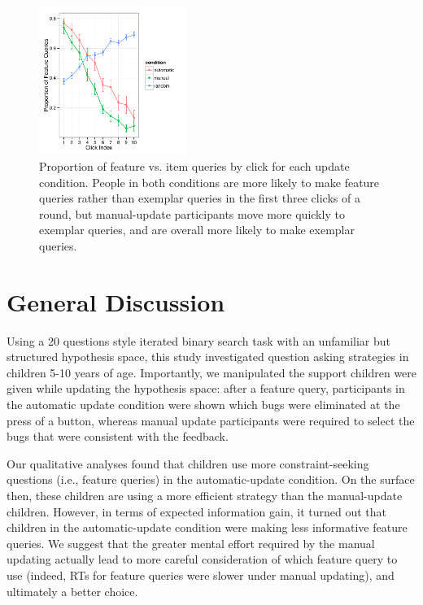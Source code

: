 \documentclass[10pt,letterpaper]{article}
\begin{document}
\begin{figure}[!h]
  \centering
  \includegraphics[width=0.43\textwidth]{figures/query_type_prop_by_click}
  \vspace{-.1cm}
  \caption{Proportion of feature vs. item queries by click for each update condition. 
People in both conditions are more likely to make feature queries rather than 
exemplar queries in the first three clicks of a round, but manual-update participants 
move more quickly to exemplar queries, and are overall more likely to make 
exemplar queries.}
  \label{fig:query-prop-click}
  \vspace{-.1cm}
\end{figure} 

\section{General Discussion}

Using a 20 questions style iterated binary search task with an unfamiliar but 
structured hypothesis space, this study investigated question asking strategies in 
children 5-10 years of age. Importantly, we manipulated the support children were 
given while updating the hypothesis space: after a feature query, participants in the 
automatic update condition were shown which bugs were eliminated at the press of 
a button, whereas manual update participants were required to select the bugs that 
were consistent with the feedback. 

Our qualitative analyses found that children use more constraint-seeking questions 
(i.e., feature queries) in the automatic-update condition. On the surface then, these 
children are using a more efficient strategy than the manual-update children. 
However, in terms of expected information gain, it turned out that children in the 
automatic-update condition were making less informative feature queries. We 
suggest that the greater mental effort required by the manual updating actually lead 
to more careful consideration of which feature query to use (indeed, RTs for feature 
queries were slower under manual updating), and ultimately a better choice.
\end{document}
